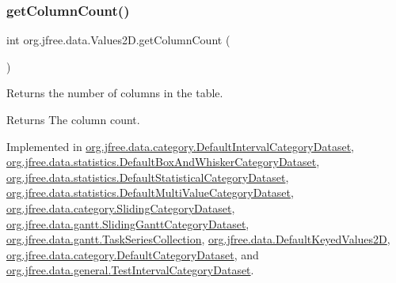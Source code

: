 \subsubsection{\texorpdfstring{get\+Column\+Count()}{getColumnCount()}}
{\footnotesize\ttfamily int org.\+jfree.\+data.\+Values2\+D.\+get\+Column\+Count (\begin{DoxyParamCaption}{ }\end{DoxyParamCaption})}

Returns the number of columns in the table.

\begin{DoxyReturn}{Returns}
The column count. 
\end{DoxyReturn}


Implemented in \mbox{\hyperlink{classorg_1_1jfree_1_1data_1_1category_1_1_default_interval_category_dataset_a6c5f88da1428294d43e58d41fdf81992}{org.\+jfree.\+data.\+category.\+Default\+Interval\+Category\+Dataset}}, \mbox{\hyperlink{classorg_1_1jfree_1_1data_1_1statistics_1_1_default_box_and_whisker_category_dataset_a27063efc7e89bbf851ba362b93b20786}{org.\+jfree.\+data.\+statistics.\+Default\+Box\+And\+Whisker\+Category\+Dataset}}, \mbox{\hyperlink{classorg_1_1jfree_1_1data_1_1statistics_1_1_default_statistical_category_dataset_a7902055e97297ac0e6a62506cbce677e}{org.\+jfree.\+data.\+statistics.\+Default\+Statistical\+Category\+Dataset}}, \mbox{\hyperlink{classorg_1_1jfree_1_1data_1_1statistics_1_1_default_multi_value_category_dataset_a0b16d76dcd1480ca382fae84309d8e47}{org.\+jfree.\+data.\+statistics.\+Default\+Multi\+Value\+Category\+Dataset}}, \mbox{\hyperlink{classorg_1_1jfree_1_1data_1_1category_1_1_sliding_category_dataset_aaa350568675875cc8c70dddd3c5d6d79}{org.\+jfree.\+data.\+category.\+Sliding\+Category\+Dataset}}, \mbox{\hyperlink{classorg_1_1jfree_1_1data_1_1gantt_1_1_sliding_gantt_category_dataset_ac28b02fa53e0050471f33e8de23e4330}{org.\+jfree.\+data.\+gantt.\+Sliding\+Gantt\+Category\+Dataset}}, \mbox{\hyperlink{classorg_1_1jfree_1_1data_1_1gantt_1_1_task_series_collection_a3435a5d25be65ed939629418205b0022}{org.\+jfree.\+data.\+gantt.\+Task\+Series\+Collection}}, \mbox{\hyperlink{classorg_1_1jfree_1_1data_1_1_default_keyed_values2_d_add387af47bf3263842b9c06ef212bad2}{org.\+jfree.\+data.\+Default\+Keyed\+Values2D}}, \mbox{\hyperlink{classorg_1_1jfree_1_1data_1_1category_1_1_default_category_dataset_a355c4edd8c94a622747aed4fcb9388a4}{org.\+jfree.\+data.\+category.\+Default\+Category\+Dataset}}, and \mbox{\hyperlink{classorg_1_1jfree_1_1data_1_1general_1_1_test_interval_category_dataset_a16d8dbc76366b7fd0f4ea38d28b04b4a}{org.\+jfree.\+data.\+general.\+Test\+Interval\+Category\+Dataset}}.

